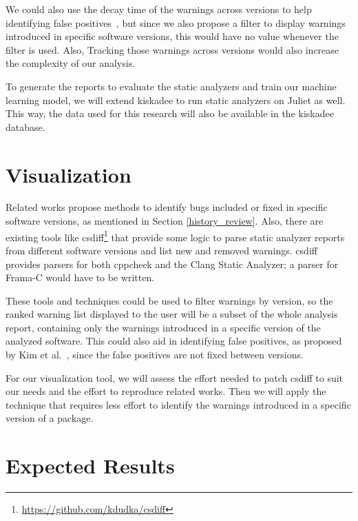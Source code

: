 We could also use the decay time of the warnings across versions to help
identifying false positives~\cite{kim_which_2007, penta_evolution_2008}, but
since we also propose a filter to display warnings introduced in specific
software versions, this would have no value whenever the filter is used.
Also, Tracking those warnings across versions would also increase the
complexity of our analysis.

To generate the reports to evaluate the static analyzers and train our machine
learning model, we will extend kiskadee to run static analyzers on Juliet as
well. This way, the data used for this research will also be available in the
kiskadee database.

\section{Visualization}
\label{sec:visualization}

Related works propose methods to identify bugs included or fixed in specific
software versions, as mentioned in Section \ref{history_review}.
Also, there are existing tools like
csdiff\footnote{\url{https://github.com/kdudka/csdiff}} that provide some
logic to parse static analyzer reports from different software versions and
list new and removed warnings. csdiff provides parsers for both cppcheck and
the Clang Static Analyzer; a parser for Frama-C would have to be written.

These tools and techniques could be used to filter warnings by version, so the
ranked warning list displayed to the user will be a subset of the whole
analysis report, containing only the warnings introduced in a specific version
of the analyzed software. This could also aid in identifying false positives,
as proposed by Kim et al.~\cite{kim_which_2007}, since the false positives are
not fixed between versions.

For our visualization tool, we will assess the effort needed to patch csdiff
to suit our needs and the effort to reproduce related works. Then we will
apply the technique that requires less effort to identify the warnings introduced
in a specific version of a package.

\section{Expected Results}

